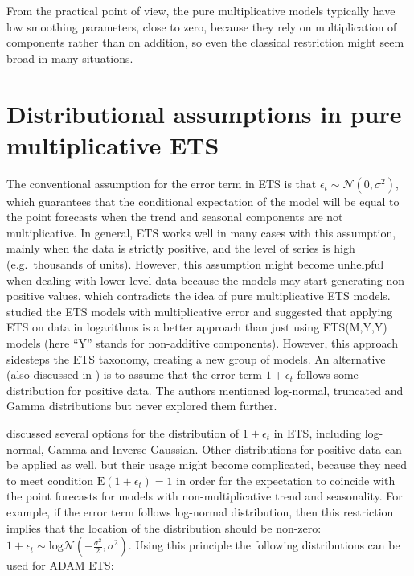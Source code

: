 \documentclass[
]{book}
\theoremstyle{definition}
\theoremstyle{definition}
\theoremstyle{definition}
\theoremstyle{definition}
\theoremstyle{remark}
\begin{document}
From the practical point of view, the pure multiplicative models typically have low smoothing parameters, close to zero, because they rely on multiplication of components rather than on addition, so even the classical restriction might seem broad in many situations.

\hypertarget{ADAMETSMultiplicativeDistributions}{%
\section{Distributional assumptions in pure multiplicative ETS}\label{ADAMETSMultiplicativeDistributions}}

The conventional assumption for the error term in ETS is that \(\epsilon_t\sim\mathcal{N}(0,\sigma^2)\), which guarantees that the conditional expectation of the model will be equal to the point forecasts when the trend and seasonal components are not multiplicative. In general, ETS works well in many cases with this assumption, mainly when the data is strictly positive, and the level of series is high (e.g.~thousands of units). However, this assumption might become unhelpful when dealing with lower-level data because the models may start generating non-positive values, which contradicts the idea of pure multiplicative ETS models. \citet{Akram2009} studied the ETS models with multiplicative error and suggested that applying ETS on data in logarithms is a better approach than just using ETS(M,Y,Y) models (here ``Y'' stands for non-additive components). However, this approach sidesteps the ETS taxonomy, creating a new group of models. An alternative (also discussed in \citet{Akram2009}) is to assume that the error term \(1+\epsilon_t\) follows some distribution for positive data. The authors mentioned log-normal, truncated and Gamma distributions but never explored them further.

\citet{Svetunkov2020ETS} discussed several options for the distribution of \(1+\epsilon_t\) in ETS, including log-normal, Gamma and Inverse Gaussian. Other distributions for positive data can be applied as well, but their usage might become complicated, because they need to meet condition \(\mathrm{E}(1+\epsilon_t)=1\) in order for the expectation to coincide with the point forecasts for models with non-multiplicative trend and seasonality. For example, if the error term follows log-normal distribution, then this restriction implies that the location of the distribution should be non-zero: \(1+\epsilon_t\sim\mathrm{log}\mathcal{N}\left(-\frac{\sigma^2}{2},\sigma^2\right)\). Using this principle the following distributions can be used for ADAM ETS:
\end{document}
